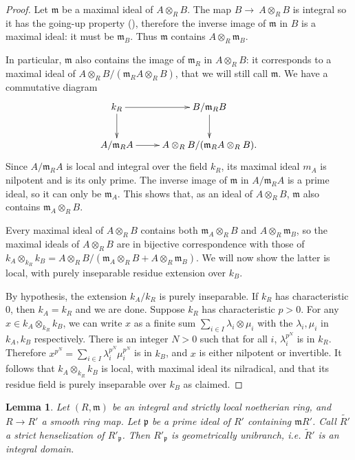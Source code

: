 \documentclass[a4paper,10pt,twoside]{article}
\newcommand{\ra}{\rightarrow}
\newcommand{\m}{\mathfrak{m}}
\newcommand{\p}{\mathfrak{p}}
\newtheorem{lem}[thm]{Lemma}
\theoremstyle{definition}
\theoremstyle{remark}
\begin{document}
\begin{proof}
Let $\m$ be a maximal ideal of $A\otimes_R B$. The map $B\ra~A\otimes_R B$ is integral so it has the going-up property (\cite[\href{https://stacks.math.columbia.edu/tag/00GU}{Tag 00GU}]{stacks-project}), therefore the inverse image of $\m$ in $B$ is a maximal ideal: it must be $\m_B$. Thus $\m$ contains $A\otimes_R\m_B$.

In particular, $\m$ also contains the image of $\m_R$ in $A\otimes_R B$: it corresponds to a maximal ideal of $A\otimes_R B/(\m_R A\otimes_R B)$, that we will still call $\m$. We have a commutative diagram
\[
\xymatrix{
k_R\ar[r]\ar[d]&B/\m_R B\ar[d]\\
A/\m_R A\ar[r]&A\otimes_R B/(\m_R A\otimes_R B).
}
\]
Since $A/\m_R A$ is local and integral over the field $k_R$, its maximal ideal $m_A$ is nilpotent and is its only prime. The inverse image of $\m$ in $A/\m_R A$ is a prime ideal, so it can only be $\m_A$. This shows that, as an ideal of $A\otimes_R B$, $\m$ also contains $\m_A\otimes_R B$.

Every maximal ideal of $A\otimes_R B$ contains both $\m_A\otimes_R B$ and $A\otimes_R\m_B$, so the maximal ideals of $A\otimes_R B$ are in bijective correspondence with those of $k_A\otimes_{k_R} k_B=A\otimes_R B/(\m_A\otimes_R B+A\otimes_R\m_B)$. We will now show the latter is local, with purely inseparable residue extension over $k_B$.

By hypothesis, the extension $k_A/k_R$ is purely inseparable. If $k_R$ has characteristic $0$, then $k_A=k_R$ and we are done. Suppose $k_R$ has characteristic $p>0$. For any $x\in k_A\otimes_{k_R} k_B$, we can write $x$ as a finite sum $\sum\limits_{i\in I}\lambda_i\otimes\mu_i$ with the $\lambda_i,\mu_i$ in $k_A,k_B$ respectively. There is an integer $N>0$ such that for all $i$, $\lambda_i^{p^N}$ is in $k_R$. Therefore $x^{p^N}=\sum\limits_{i\in I}\lambda_i^{p^N}\mu_i^{p^N}$ is in $k_B$, and $x$ is either nilpotent or invertible. It follows that $k_A\otimes_{k_R} k_B$ is local, with maximal ideal its nilradical, and that its residue field is purely inseparable over $k_B$ as claimed.
\end{proof}

\begin{lem}\label{lemme unibranche implique unibranche apres morphisme lisse local}
Let $(R,\m)$ be an integral and strictly local noetherian ring, and $R\ra R'$ a smooth ring map. Let $\p$ be a prime ideal of $R'$ containing $\m R'$. Call $\tilde{R'}$ a strict henselization of $R'_\p$. Then $R'_\p$ is geometrically unibranch, i.e. $\tilde{R}'$ is an integral domain.
\end{lem}
\end{document}
